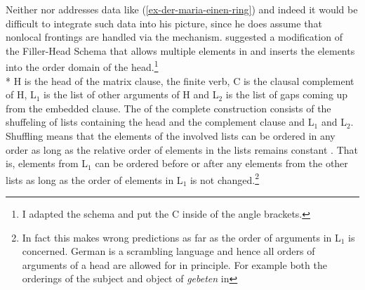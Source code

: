 \begin{exe}
\begin{xlist}
Neither \citet{Wetta2011a} nor  addresses data like (\ref{ex-der-maria-einen-ring}) and indeed it would be difficult to integrate such data into
his picture, since he does assume that nonlocal frontings are handled via the \slasch
mechanism. \citet{Wetta2018a} suggested a modification of the Filler-Head Schema that allows
multiple elements in \slasch and inserts the \slasch elements into the order domain of the
head.\footnote{
  I adapted the schema and put the C inside of the angle brackets.
}
\ea
\label{schema-f-g-wetta}
 \impl\\*
\z
H is the head of the matrix clause, the finite verb, C is the clausal complement of H, L$_1$ is the
list of other arguments of H and L$_2$ is the list of gaps coming up from the embedded clause. The
\dtrsl of the complete construction consists of the shuffeling of lists containing the head and the
complement clause and L$_1$ and L$_2$. Shuffling means that the elements of the involved lists can be
ordered in any order as long as the relative order of elements in the lists remains constant \citep{Reape94a}. That
is, elements from L$_1$ can be ordered before or after any elements from the other lists as long as
the order of elements in L$_1$ is not changed.\footnote{
  In fact this makes wrong predictions as far as the order of arguments in L$_1$ is
  concerned. German is a scrambling language and hence all orders of arguments of a head are allowed
  for in principle. For example both the orderings of the subject and object of \emph{gebeten} in
}
\end{xlist}
\end{exe}
